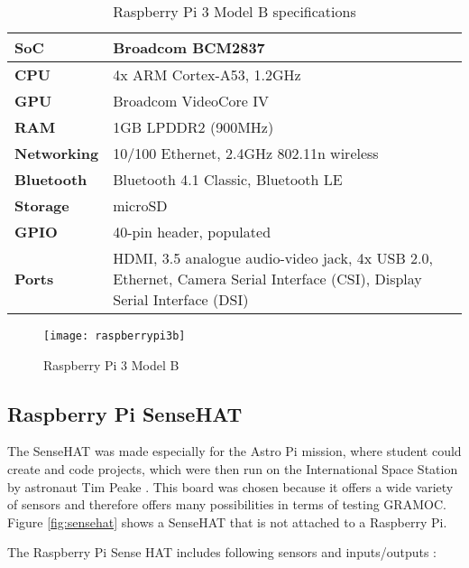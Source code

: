 \begin{minipage}{\textwidth}
\begin{table}[h]
    \centering
    \begin{tabularx}{\linewidth}{| l | X |}
    \hline
    \textbf{SoC} & Broadcom BCM2837 \\ \hline
    \textbf{CPU} & 4x ARM Cortex-A53, 1.2GHz \\ \hline
    \textbf{GPU} & Broadcom VideoCore IV \\ \hline
    \textbf{RAM} & 1GB LPDDR2 (900MHz) \\ \hline
    \textbf{Networking} & 10/100 Ethernet, 2.4GHz 802.11n wireless \\ \hline
    \textbf{Bluetooth} & Bluetooth 4.1 Classic, Bluetooth LE \\ \hline
    \textbf{Storage} & microSD \\ \hline
    \textbf{GPIO} & 40-pin header, populated \\ \hline
    \textbf{Ports} & HDMI, 3.5 analogue audio-video jack, 4x USB 2.0, Ethernet, Camera Serial Interface (CSI), Display Serial Interface (DSI) \\ \hline
    \end{tabularx}
    \caption{Raspberry Pi 3 Model B specifications}
    \label{tab:raspispec}
\end{table}
\end{minipage}

\begin{figure}[H]
	\centering
	\texttt{[image: raspberrypi3b]}
	\caption[Raspberry Pi 3 Model B]{Raspberry Pi 3 Model B\footnotemark}
	\label{fig:raspberrypi3b}
\end{figure}


\subsection{Raspberry Pi SenseHAT}

The SenseHAT was made especially for the Astro Pi mission, where student could create and code projects, which were then run on the International Space Station by astronaut Tim Peake \autocite{AstroPiMission}. This board was chosen because it offers a wide variety of sensors and therefore offers many possibilities in terms of testing GRAMOC. Figure \vref{fig:sensehat} shows a SenseHAT that is not attached to a Raspberry Pi.

The Raspberry Pi Sense HAT includes following sensors and inputs/outputs \autocite{SenseHAT}:

